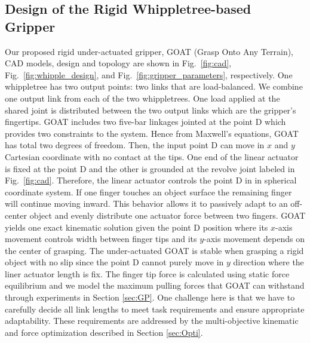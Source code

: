 \documentclass[letterpaper, 10 pt, conference]{ieeeconf}  %
\newcommand{\fig}[1]{Fig.~\ref{#1}}
\begin{document}
\subsection{Design of the Rigid Whippletree-based Gripper \label{sec:design}}
Our proposed rigid under-actuated gripper, GOAT (Grasp Onto Any Terrain), CAD models, design and topology are shown in \fig{fig:cad}, \fig{fig:whipple_design}, and \fig{fig:gripper_parameters}, respectively. One whippletree has two output points: two links that are load-balanced. We combine one output link from each of the two whippletrees. One load applied at the shared joint is distributed between the two output links which are the gripper's fingertips. 
GOAT includes two five-bar linkages jointed at the point D which provides two constraints to the system. Hence from Maxwell's equations, GOAT has total two degrees of freedom. Then, the input point D can move in $x$ and $y$ Cartesian coordinate with no contact at the tips. One end of the linear actuator is fixed at the point D and the other is grounded at the revolve joint labeled in \fig{fig:cad}. Therefore, the linear actuator controls the point D in in spherical coordinate system.  If one finger touches an object surface the remaining finger will continue moving inward. This behavior allows it to passively adapt to an off-center object and evenly distribute one actuator force between two fingers. %
GOAT yields one exact kinematic solution given the point D position where its $x$-axis movement controls width between finger tips and its $y$-axis movement depends on the center of grasping. The under-actuated GOAT is stable when grasping a rigid object with no slip since the point D cannot purely move in $y$ direction where the liner actuator length is fix.  
 The finger tip force is calculated using static force equilibrium and we model the maximum pulling forces that GOAT can withstand through experiments in Section \ref{sec:GP}. One challenge here is that we have to carefully decide all link lengths to meet task requirements and ensure appropriate adaptability. These requirements are addressed by the multi-objective kinematic and force optimization described in Section \ref{sec:Opti}.
\end{document}
